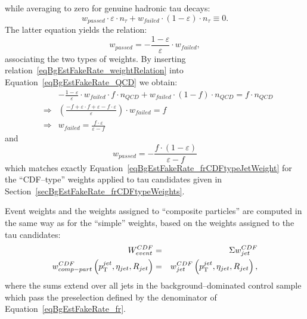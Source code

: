while averaging to zero for genuine hadronic tau decays:
\begin{equation*}
w_{passed} \cdot \varepsilon \cdot n_{\tau} + w_{failed} \cdot \left( 1 - \varepsilon \right) \cdot n_{\tau} \equiv 0.
\label{eqBgEstFakeRate_tau}
\end{equation*}
The latter equation yields the relation:
\begin{equation}
w_{passed} = -\frac{1 - \varepsilon}{\varepsilon} \cdot w_{failed},
\label{eqBgEstFakeRate_weightRelation}
\end{equation}
associating the two types of weights.  By inserting
relation~\ref{eqBgEstFakeRate_weightRelation} into
Equation~\ref{eqBgEstFakeRate_QCD} we obtain:
\begin{eqnarray*}
& & -\frac{1 - \varepsilon}{\varepsilon} \cdot w_{failed} \cdot f \cdot n_{QCD} + w_{failed} \cdot \left( 1 - f \right) \cdot n_{QCD} 
 = f \cdot n_{QCD} \\
& \Rightarrow & \left( \frac{-f + \varepsilon \cdot f + \varepsilon - f \cdot \varepsilon}{\varepsilon} \right) \cdot w_{failed} = f \\
& \Rightarrow & w_{failed} = \frac{f \cdot \varepsilon}{\varepsilon - f} 
\end{eqnarray*}
and 
\begin{equation}
w_{passed} = -\frac{f \cdot \left( 1 - \varepsilon \right)}{\varepsilon - f}
\end{equation}
which matches exactly Equation~\ref{eqBgEstFakeRate_frCDFtypeJetWeight} for the
``CDF--type'' weights applied to tau candidates given in
Section~\ref{secBgEstFakeRate_frCDFtypeWeights}.

Event weights and the weights assigned to ``composite particles'' 
are computed in the same way as for the ``simple'' weights,
based on the weights assigned to the tau candidates:
\begin{eqnarray}
W_{event}^{CDF} & = & \Sigma w_{jet}^{CDF} \nonumber \\
w_{comp-part}^{CDF} \left( p_{\mathrm{T}}^{jet}, \eta_{jet}, R_{jet} \right) & = & 
  w_{jet}^{CDF} \left( p_{\mathrm{T}}^{jet}, \eta_{jet}, R_{jet} \right),
\label{eqBgEstFakeRate_frCDFtypeEvent_and_CompositeParticleWeight}
\end{eqnarray}
where the sums extend over all jets in the background--dominated control sample
which pass the preselection defined by the denominator of
Equation~\ref{eqBgEstFakeRate_fr}.

